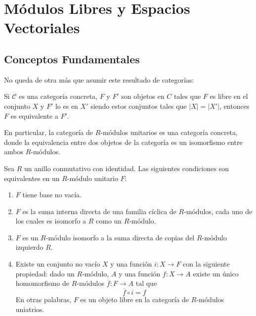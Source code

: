 \documentclass[12pt]{report}
\newcounter{it}
\theoremstyle{largebreak}
\newcommand\abs[1]{\ensuremath{\big|#1\big|}}
\newcommand\cf[3]{\ensuremath{#1:#2\rightarrow#3}}
\begin{document}
    \newpage

    \chapter{Módulos Libres y Espacios Vectoriales}

    \section{Conceptos Fundamentales}

    No queda de otra más que asumir este resultado de categorías:

    \begin{theor}
        Si $\mathcal{C}$ es una categoría concreta, $F$ y $F'$ son objetos en $C$ tales que $F$ es libre en el conjunto $X$ y $F'$ lo es en $X'$ siendo estos conjuntos tales que $\abs{X}=\abs{X'}$, entonces $F$ es equivalente a $F'$.
    \end{theor}

    En particular, la categoría de $R$-módulos unitarios es una categoría concreta, donde la equivalencia entre dos objetos de la categoría es un isomorfismo entre ambos $R$-módulos.

    \begin{theor}
        Sea $R$ un anillo conmutativo con identidad. Las siguientes condiciones son equivalentes en un $R$-módulo unitario $F$:
        \renewcommand{\theenumi}{\roman{enumi}}
        \begin{enumerate}
            \item $F$ tiene base no vacía.
            \item $F$ es la suma interna directa de una familia cíclica de $R$-módulos, cada uno de los cuales es isomorfo a $R$ como un $R$-módulo.
            \item $F$ es un $R$-módulo isomorfo a la suma directa de copias del $R$-módulo izquierdo $R$.
            \item Existe un conjunto no vacío $X$ y una función $\cf{i}{X}{F}$ con la siguiente propiedad: dado un $R$-módulo, $A$ y una función $\cf{f}{X}{A}$ existe un único homomorfismo de $R$-módulos $\cf{\overline{f}}{F}{A}$ tal que
            \begin{equation*}
                \overline{f}\circ i=f
            \end{equation*}
            En otras palabras, $F$ es un objeto libre en la categoría de $R$-módulos uniatrios.
        \end{enumerate}
    \end{theor}
\end{document}
